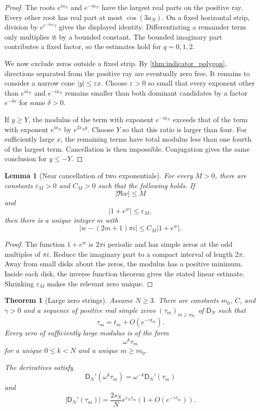 \documentclass{aomart}
\newtheorem{theorem}{Theorem}[section]
\newtheorem{lemma}[lemma]{Lemma}
\theoremstyle{definition}
\theoremstyle{remark}
\newcommand{\Dfun}{\mathsf D}
\begin{document}
\begin{proof}
The roots $e^{ia_N}$ and $e^{-ia_N}$ have the largest real parts on the positive ray.  Every other root has real part at most $\cos(3a_N)$.  On a fixed horizontal strip, division by $e^{e^{-ia_N}z}$ gives the displayed identity.  Differentiating a remainder term only multiplies it by a bounded constant.  The bounded imaginary part contributes a fixed factor, so the estimates hold for $q=0,1,2$.

We now exclude zeros outside a fixed strip.  By \cref{thm:indicator_polygon}, directions separated from the positive ray are eventually zero free.  It remains to consider a narrow cone $|y|\leq\varepsilon x$.  Choose $\varepsilon>0$ so small that every exponent other than $e^{ia_N}$ and $e^{-ia_N}$ remains smaller than both dominant candidates by a factor $e^{-\delta x}$ for some $\delta>0$.

If $y\geq Y$, the modulus of the term with exponent $e^{-ia_N}$ exceeds that of the term with exponent $e^{ia_N}$ by $e^{2s_Ny}$.  Choose $Y$ so that this ratio is larger than four.  For sufficiently large $x$, the remaining terms have total modulus less than one fourth of the largest term.  Cancellation is then impossible.  Conjugation gives the same conclusion for $y\leq-Y$.
\end{proof}

\begin{lemma}[Near cancellation of two exponentials]\label{lem:near_cancellation}
For every $M>0$, there are constants $\varepsilon_M>0$ and $C_M>0$ such that the following holds.  If
\[
|\Re w|\leq M
\]
and
\[
|1+e^w|\leq\varepsilon_M,
\]
then there is a unique integer $m$ with
\[
|w-(2m+1)\pi i|
\leq
C_M|1+e^w|.
\]
\end{lemma}

\begin{proof}
The function $1+e^w$ is $2\pi i$ periodic and has simple zeros at the odd multiples of $\pi i$.  Reduce the imaginary part to a compact interval of length $2\pi$.  Away from small disks about the zeros, the modulus has a positive minimum.  Inside each disk, the inverse function theorem gives the stated linear estimate.  Shrinking $\varepsilon_M$ makes the relevant zero unique.
\end{proof}

\begin{theorem}[Large zero strings]\label{thm:large_zero_strings}
Assume $N\geq3$.  There are constants $m_0$, $C$, and $\gamma>0$ and a sequence of positive real simple zeros $(\tau_m)_{m\geq m_0}$ of $\Dfun_N$ such that
\[
\tau_m
=
 t_m+O(e^{-\gamma t_m}).
\]
Every zero of sufficiently large modulus is of the form
\[
\omega^k\tau_m
\]
for a unique $0\leq k<N$ and a unique $m\geq m_0$.

The derivatives satisfy
\[
\Dfun_N'(\omega^k\tau_m)
=
\omega^{-k}\Dfun_N'(\tau_m)
\]
and
\[
|\Dfun_N'(\tau_m)|
=
\frac{2s_N}{N}e^{c_N\tau_m}
\left(1+O(e^{-\gamma\tau_m})\right).
\]
\end{theorem}
\end{document}
